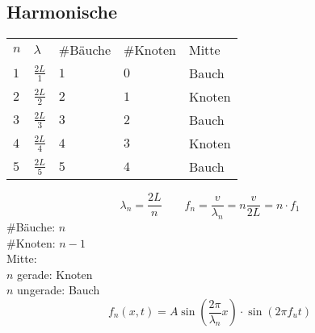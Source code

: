 \subsection{Harmonische}
\begin{tabular}{lllll}
\rowcolor{white} $n$ & $\lambda$       & \#Bäuche & \#Knoten & Mitte \\
\rowcolor{lgray} $1$ & $\frac{2 L}{1}$ & $1$      & $0$      & Bauch \\
\rowcolor{white} $2$ & $\frac{2 L}{2}$ & $2$      & $1$      & Knoten \\
\rowcolor{lgray} $3$ & $\frac{2 L}{3}$ & $3$      & $2$      & Bauch \\
\rowcolor{white} $4$ & $\frac{2 L}{4}$ & $4$      & $3$      & Knoten \\
\rowcolor{lgray} $5$ & $\frac{2 L}{5}$ & $5$      & $4$      & Bauch \\
\end{tabular}
\[ \lambda_n = \frac{2 L}{n} \qquad f_n = \frac{v}{\lambda_n} 
= n \frac{v}{2 L} = n \cdot f_1 \]
\#Bäuche: $n$ \\
\#Knoten: $n - 1$ \\
Mitte: \\
$n$ gerade: Knoten \\
$n$ ungerade: Bauch
\[ f_n(x, t) 
= A \sin\left(\frac{2 \pi}{\lambda_n} x\right) \cdot \sin(2 \pi f_u t) \]